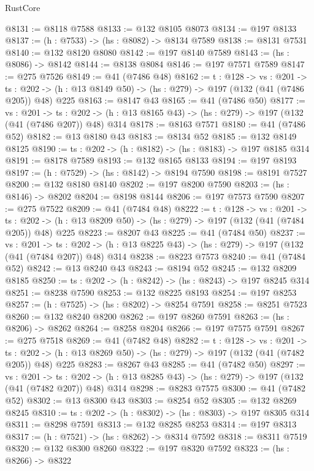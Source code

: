 \begin{lexlean}{RustCore}
\begin{coremodule}
@8131 := @8118 @7588
@8133 := @132 @8105 @8073
@8134 := @197 @8133
@8137 := (h : @7533) -> (hs : @8082) -> @8134 @7589
@8138 := @8131 @7531
@8140 := @132 @8120 @8080
@8142 := @197 @8140 @7589
@8143 := (hs : @8086) -> @8142
@8144 := @8138 @8084
@8146 := @197 @7571 @7589
@8147 := @275 @7526
@8149 := @41 (@7486 @48)
@8162 := {t : @128} ->
  {vs : @201} ->
  {ts : @202} -> (h : @13 @8149 @50) -> (hs : @279) -> @197 (@132 (@41 (@7486 @205)) @48) @225
@8163 := @8147 @43
@8165 := @41 (@7486 @50)
@8177 := {vs : @201} ->
  {ts : @202} -> (h : @13 @8165 @43) -> (hs : @279) -> @197 (@132 (@41 (@7486 @207)) @48) @314
@8178 := @8163 @7571
@8180 := @41 (@7486 @52)
@8182 := @13 @8180 @43
@8183 := @8134 @52
@8185 := @132 @8149 @8125
@8190 := {ts : @202} -> (h : @8182) -> (hs : @8183) -> @197 @8185 @314
@8191 := @8178 @7589
@8193 := @132 @8165 @8133
@8194 := @197 @8193
@8197 := (h : @7529) -> (hs : @8142) -> @8194 @7590
@8198 := @8191 @7527
@8200 := @132 @8180 @8140
@8202 := @197 @8200 @7590
@8203 := (hs : @8146) -> @8202
@8204 := @8198 @8144
@8206 := @197 @7573 @7590
@8207 := @275 @7522
@8209 := @41 (@7484 @48)
@8222 := {t : @128} ->
  {vs : @201} ->
  {ts : @202} -> (h : @13 @8209 @50) -> (hs : @279) -> @197 (@132 (@41 (@7484 @205)) @48) @225
@8223 := @8207 @43
@8225 := @41 (@7484 @50)
@8237 := {vs : @201} ->
  {ts : @202} -> (h : @13 @8225 @43) -> (hs : @279) -> @197 (@132 (@41 (@7484 @207)) @48) @314
@8238 := @8223 @7573
@8240 := @41 (@7484 @52)
@8242 := @13 @8240 @43
@8243 := @8194 @52
@8245 := @132 @8209 @8185
@8250 := {ts : @202} -> (h : @8242) -> (hs : @8243) -> @197 @8245 @314
@8251 := @8238 @7590
@8253 := @132 @8225 @8193
@8254 := @197 @8253
@8257 := (h : @7525) -> (hs : @8202) -> @8254 @7591
@8258 := @8251 @7523
@8260 := @132 @8240 @8200
@8262 := @197 @8260 @7591
@8263 := (hs : @8206) -> @8262
@8264 := @8258 @8204
@8266 := @197 @7575 @7591
@8267 := @275 @7518
@8269 := @41 (@7482 @48)
@8282 := {t : @128} ->
  {vs : @201} ->
  {ts : @202} -> (h : @13 @8269 @50) -> (hs : @279) -> @197 (@132 (@41 (@7482 @205)) @48) @225
@8283 := @8267 @43
@8285 := @41 (@7482 @50)
@8297 := {vs : @201} ->
  {ts : @202} -> (h : @13 @8285 @43) -> (hs : @279) -> @197 (@132 (@41 (@7482 @207)) @48) @314
@8298 := @8283 @7575
@8300 := @41 (@7482 @52)
@8302 := @13 @8300 @43
@8303 := @8254 @52
@8305 := @132 @8269 @8245
@8310 := {ts : @202} -> (h : @8302) -> (hs : @8303) -> @197 @8305 @314
@8311 := @8298 @7591
@8313 := @132 @8285 @8253
@8314 := @197 @8313
@8317 := (h : @7521) -> (hs : @8262) -> @8314 @7592
@8318 := @8311 @7519
@8320 := @132 @8300 @8260
@8322 := @197 @8320 @7592
@8323 := (hs : @8266) -> @8322

\end{coremodule}
\end{lexlean}
